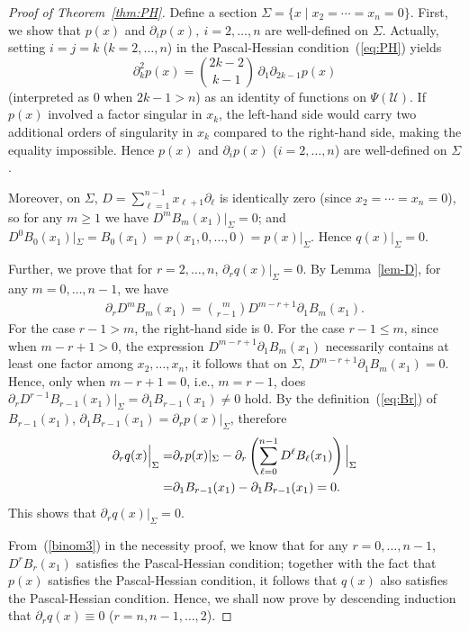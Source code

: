\documentclass[11pt]{article}
\begin{document}
\begin{proof}[Proof of Theorem~\ref{thm:PH}]
	Define a section $\Sigma = \{x\mid x_2=\cdots=x_n=0\}$. First, we show that $p(x)$ and $\partial_i p(x),~i=2,\ldots,n$ are well-defined on $\Sigma$. Actually, setting $i=j=k$ ($k=2,\ldots,n$) in the Pascal-Hessian condition~(\ref{eq:PH}) yields
	\[
	\partial_k^2 p(x) = \binom{2k-2}{k-1}\,\partial_1\partial_{2k-1}p(x)
	\]
	(interpreted as $0$ when $2k-1>n$) as an identity of functions on $\Psi(\mathcal{U})$. If $p(x)$ involved a factor singular in $x_k$, the left-hand side would carry two additional orders of singularity in $x_k$ compared to the right-hand side, making the equality impossible. Hence $p(x)$ and $\partial_i p(x)$ ($i=2,\ldots,n$) are well-defined on $\Sigma$.
	
	Moreover, on $\Sigma$, $D = \sum_{\ell=1}^{n-1} x_{\ell+1}\partial_\ell$ is identically zero (since $x_2=\cdots=x_n=0$), so for any $m\geq 1$ we have $D^m B_m(x_1)|_\Sigma = 0$; and $D^0 B_0(x_1)|_\Sigma = B_0(x_1) = p(x_1,0,\ldots,0) = p(x)|_\Sigma$. Hence $q(x)|_\Sigma = 0$.
	
	Further, we prove that for $r=2,\ldots,n$, $\partial_r q(x)|_\Sigma=0$. By Lemma~\ref{lem-D}, for any $m=0,\ldots,n-1$, we have
	\begin{align}
		\partial_r D^m B_m(x_1) = \binom{m}{r-1} D^{m-r+1} \partial_1 B_m(x_1).
	\end{align}
	For the case $r-1>m$, the right-hand side is $0$. For the case $r-1\leq m$, since when $m-r+1 > 0$, the expression $D^{m-r+1}\partial_1 B_m(x_1)$ necessarily contains at least one factor among $x_2,\ldots,x_n$, it follows that on $\Sigma$, $D^{m-r+1}\partial_1 B_m(x_1)=0$. Hence, only when $m-r+1 = 0$, i.e., $m = r-1$, does $\partial_r D^{r-1} B_{r-1}(x_1)|_\Sigma = \partial_1 B_{r-1}(x_1)\neq 0$ hold. By the definition~(\ref{eq:Br}) of $B_{r-1}(x_1)$, $\partial_1B_{r-1}(x_1) = \partial_r p(x)|_\Sigma$, therefore
	\begin{align}
		\partial_rq(x)\Big|_\Sigma=&\partial_r p(x)|_\Sigma-\partial_r\left(\sum_{\ell=0}^{n-1} D^\ell B_\ell(x_1)\right)\Big|_\Sigma\notag\\
		=&\partial_1 B_{r-1}(x_1)-\partial_1 B_{r-1}(x_1)=0.
	\end{align}
	This shows that $\partial_r q(x)|_\Sigma = 0$.
	
	From~(\ref{binom3}) in the necessity proof, we know that for any $r=0,\ldots,n-1$, $D^r B_r(x_1)$ satisfies the Pascal-Hessian condition; together with the fact that $p(x)$ satisfies the Pascal-Hessian condition, it follows that $q(x)$ also satisfies the Pascal-Hessian condition. Hence, we shall now prove by descending induction that $\partial_r q(x) \equiv 0$ ($r = n, n-1,\ldots, 2$).
	

\end{proof}
\end{document}
